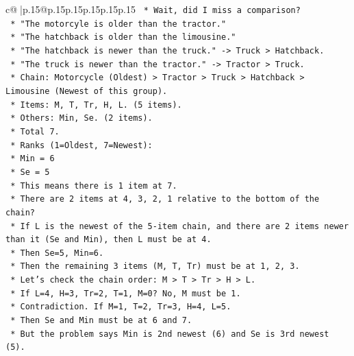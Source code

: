 \documentclass{article}
\begin{document}
{\begin{supertabular}{c@{$\;$}|p{.15\linewidth}@{}p{.15\linewidth}p{.15\linewidth}p{.15\linewidth}p{.15\linewidth}p{.15\linewidth}}
{{{\texttt{                *   Wait, did I miss a comparison?} \\
\texttt{                *   "The motorcyle is older than the tractor."} \\
\texttt{                *   "The hatchback is older than the limousine."} \\
\texttt{                *   "The hatchback is newer than the truck." {-}> Truck > Hatchback.} \\
\texttt{                *   "The truck is newer than the tractor." {-}> Tractor > Truck.} \\
\texttt{                *   Chain: Motorcycle (Oldest) > Tractor > Truck > Hatchback > Limousine (Newest of this group).} \\
\texttt{                *   Items: M, T, Tr, H, L. (5 items).} \\
\texttt{                *   Others: Min, Se. (2 items).} \\
\texttt{                *   Total 7.} \\
\texttt{                *   Ranks (1=Oldest, 7=Newest):} \\
\texttt{                    *   Min = 6} \\
\texttt{                    *   Se = 5} \\
\texttt{                    *   This means there is 1 item at 7.} \\
\texttt{                    *   There are 2 items at 4, 3, 2, 1 relative to the bottom of the chain?} \\
\texttt{                    *   If L is the newest of the 5{-}item chain, and there are 2 items newer than it (Se and Min), then L must be at 4.} \\
\texttt{                    *   Then Se=5, Min=6.} \\
\texttt{                    *   Then the remaining 3 items (M, T, Tr) must be at 1, 2, 3.} \\
\texttt{                    *   Let's check the chain order: M > T > Tr > H > L.} \\
\texttt{                    *   If L=4, H=3, Tr=2, T=1, M=0? No, M must be 1.} \\
\texttt{                    *   Contradiction. If M=1, T=2, Tr=3, H=4, L=5.} \\
\texttt{                    *   Then Se and Min must be at 6 and 7.} \\
\texttt{                    *   But the problem says Min is 2nd newest (6) and Se is 3rd newest (5).} \\
}}}
\end{supertabular}}
\end{document}

